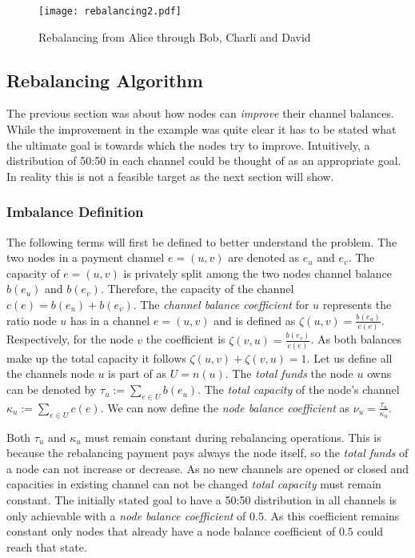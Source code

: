 \documentclass[final]{fhnwreport}       %
\begin{document}
\begin{figure}[H]
\centering
\texttt{[image: rebalancing2.pdf]}
\caption{Rebalancing from Alice through Bob, Charli and David}
\label{fig:rebal2}
\end{figure}

\subsection{Rebalancing Algorithm}\label{subsec:rebal_algo}
The previous section was about how nodes can \emph{improve} their channel balances. While the improvement in the example was quite clear it has to be stated what the ultimate goal is towards which the nodes try to improve. Intuitively, a distribution of 50:50 in each channel could be thought of as an appropriate goal. In reality this is not a feasible target as the next section will show.

\subsubsection{Imbalance Definition}
The following terms will first be defined to better understand the problem. The two nodes in a payment channel $e=(u,v)$ are denoted as $e_u$ and $e_v$. The capacity of $e=(u,v)$ is privately split among the two nodes channel balance $b(e_u)$ and $b(e_v)$. Therefore, the capacity of the channel $c(e)=b(e_u)+b(e_v)$. The \emph{channel balance coefficient } for $u$ represents the ratio node $u$ has in a channel $e=(u,v)$ and is defined as $\zeta{(u,v)}=\frac{b(e_u)}{c(e)}$. Respectively, for the node $v$ the coefficient is $\zeta{(v,u)}=\frac{b(e_v)}{c(e)}$. As both balances make up the total capacity it follows  $\zeta{(u,v)} + \zeta{(v,u)}=1$. Let us define all the channels node $u$ is part of as $U=n(u)$. The \emph{total funds} the node $u$ owns can be denoted by $\tau_u:=\displaystyle{\sum_{e\in U}b(e_u)}$. The \emph{total capacity} of the node's channel $\kappa_u:=\displaystyle{\sum_{e\in U}c(e)}$. We can now define the \emph{node balance coefficient} as $\nu_u = \frac{\tau_u}{\kappa_u}$.

Both $\tau_u$ and $\kappa_u$ must remain constant during rebalancing operations. This is because the rebalancing payment pays always the node itself, so the \emph{total funds} of a node can not increase or decrease. As no new channels are opened or closed and capacities in existing channel can not be changed \emph{total capacity} must remain constant. The initially stated goal to have a 50:50 distribution in all channels is only achievable with a \emph{node balance coefficient} of $0.5$. As this coefficient remains constant only nodes that already have a node balance coefficient of $0.5$ could reach that state.
\end{document}
